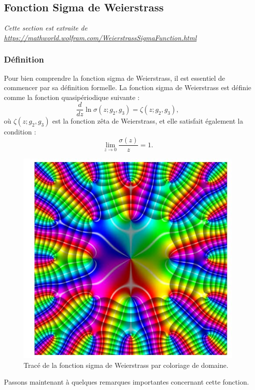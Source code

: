 \documentclass[12pt]{article}
\begin{document}
                        \subsection{Fonction Sigma de Weierstrass}
                        \textit{Cette section est extraite de \url{https://mathworld.wolfram.com/WeierstrassSigmaFunction.html}}
                        \subsubsection{Définition}
                        Pour bien comprendre la fonction sigma de Weierstrass, il est essentiel de commencer par sa définition formelle. La fonction sigma de Weierstrass est définie comme la fonction quasipériodique suivante :
                        \[
                        \frac{d}{dz} \ln \sigma (z; g_2, g_3) = \zeta (z; g_2, g_3), \tag{1}
                        \]
                        où $\zeta (z; g_2, g_3)$ est la fonction zêta de Weierstrass, et elle satisfait également la condition :
                        \[
                        \lim_{z \to 0} \frac{\sigma (z)}{z} = 1. \tag{2}
                        \]
                        

                        
                        \begin{figure}
                            \centering
                            \includegraphics[width=\linewidth]{sigma_function.jpeg}
                            \caption{Tracé de la fonction sigma de Weierstrass par coloriage de domaine.}
                        \end{figure}
                        \newpage
                        Passons maintenant à quelques remarques importantes concernant cette fonction.
                        
\end{document}
